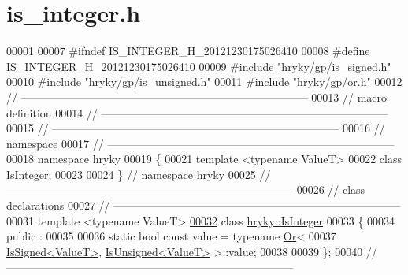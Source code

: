 \hypertarget{is__integer_8h_source}{\section{is\-\_\-integer.\-h}
}

\begin{DoxyCode}
00001 
00007 \textcolor{preprocessor}{#ifndef IS\_INTEGER\_H\_20121230175026410}
00008 \textcolor{preprocessor}{}\textcolor{preprocessor}{#define IS\_INTEGER\_H\_20121230175026410}
00009 \textcolor{preprocessor}{}\textcolor{preprocessor}{#include "\hyperlink{is__signed_8h}{hryky/gp/is_signed.h}"}
00010 \textcolor{preprocessor}{#include "\hyperlink{is__unsigned_8h}{hryky/gp/is_unsigned.h}"}
00011 \textcolor{preprocessor}{#include "\hyperlink{or_8h}{hryky/gp/or.h}"}
00012 \textcolor{comment}{//
      ------------------------------------------------------------------------------}
00013 \textcolor{comment}{// macro definition}
00014 \textcolor{comment}{//
      ------------------------------------------------------------------------------}
00015 \textcolor{comment}{//
      ------------------------------------------------------------------------------}
00016 \textcolor{comment}{// namespace}
00017 \textcolor{comment}{//
      ------------------------------------------------------------------------------}
00018 \textcolor{keyword}{namespace }hryky
00019 \{
00021     \textcolor{keyword}{template} <\textcolor{keyword}{typename} ValueT>
00022     \textcolor{keyword}{class }IsInteger;
00023 
00024 \} \textcolor{comment}{// namespace hryky}
00025 \textcolor{comment}{//
      ------------------------------------------------------------------------------}
00026 \textcolor{comment}{// class declarations}
00027 \textcolor{comment}{//
      ------------------------------------------------------------------------------}
00031 \textcolor{comment}{}\textcolor{keyword}{template} <\textcolor{keyword}{typename} ValueT>
\hypertarget{is__integer_8h_source_l00032}{}\hyperlink{classhryky_1_1_is_integer}{00032} \textcolor{keyword}{class }\hyperlink{classhryky_1_1_is_integer}{hryky::IsInteger}
00033 \{
00034 \textcolor{keyword}{public} :
00035 
00036     \textcolor{keyword}{static} \textcolor{keywordtype}{bool} \textcolor{keyword}{const} value = \textcolor{keyword}{typename} \hyperlink{classhryky_1_1_or}{Or}<
00037         \hyperlink{classhryky_1_1_is_signed}{IsSigned<ValueT>}, \hyperlink{classhryky_1_1_is_unsigned}{IsUnsigned<ValueT>} >::value;
00038 
00039 \};
00040 \textcolor{comment}{//
      ------------------------------------------------------------------------------}

\end{DoxyCode}
